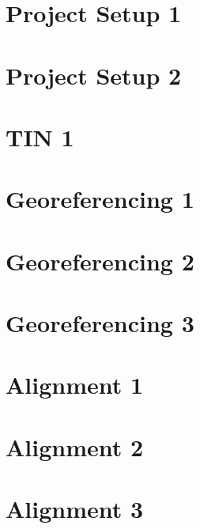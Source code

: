 \documentclass{scrartcl}
\begin{document}
\section{Project Setup 1}
\label{sec:project_setup_1}
\clearpage

\section{Project Setup 2}
\label{sec:project_setup_2}
\clearpage


\section{TIN 1}
\label{sec:tin_1}
\clearpage

\section{Georeferencing 1}
\label{sec:georeferencing_1}
\clearpage

\section{Georeferencing 2}
\label{sec:georeferencing_2}
\clearpage

\section{Georeferencing 3}
\label{sec:georeferencing_3}
\clearpage


\section{Alignment 1}
\label{sec:align_1}
\clearpage

\section{Alignment 2}
\label{sec:align_2}
\clearpage

\section{Alignment 3}
\label{sec:align_3}
\clearpage
\end{document}

